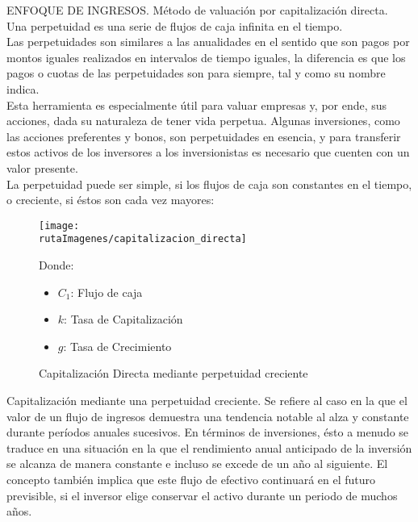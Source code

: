 \textcolor{secundario}{ENFOQUE DE INGRESOS. M\'etodo de valuaci\'on por capitalizaci\'on directa. }\\



Una \textcolor{principal}{perpetuidad} es una serie de flujos de caja infinita en el tiempo. \\

Las \textcolor{principal}{perpetuidades} son similares a las anualidades en el sentido que son pagos por montos iguales realizados en intervalos de tiempo iguales, la diferencia es que los pagos o cuotas de las perpetuidades son para siempre, tal y como su nombre indica. \\

Esta herramienta es especialmente \'util para valuar empresas y, por ende, sus acciones, dada su naturaleza de tener vida perpetua. Algunas inversiones, como las acciones preferentes y bonos, son perpetuidades en esencia, y para transferir estos activos de los inversores a los inversionistas es necesario que cuenten con un valor presente.\\

La perpetuidad puede ser simple, si los flujos de caja son constantes en el tiempo, o creciente, si \'estos son cada vez mayores:\\


\begin{center}
\begin{figure}[H]
\centering
	\caption{Capitalizaci\'on Directa mediante perpetuidad creciente\label{fig:cap_dir}}
	\texttt{[image: \\rutaImagenes/capitalizacion\_directa]}\\
	
	\begin{minipage}{5cm}
	Donde:
	\begin{itemize}
	
		\item $C_1$: Flujo de caja
		\item $k$: Tasa de Capitalizaci\'on
		\item $g$: Tasa de Crecimiento
	\end{itemize}
	\end{minipage}
\end{figure}
\end{center}

\textcolor{principal}{Capitalizaci\'on mediante una perpetuidad creciente.} Se refiere al caso en la que el valor de un flujo de ingresos demuestra una tendencia notable al alza y constante durante per\'iodos anuales sucesivos. En t\'erminos de inversiones, \'esto a menudo se traduce en una situaci\'on en la que el rendimiento anual anticipado de la inversi\'on se alcanza de manera constante e incluso se excede de un a\~no al siguiente. El concepto tambi\'en implica que este flujo de efectivo continuar\'a en el futuro previsible, si el inversor elige conservar el activo durante un periodo de muchos a\~nos.\\


